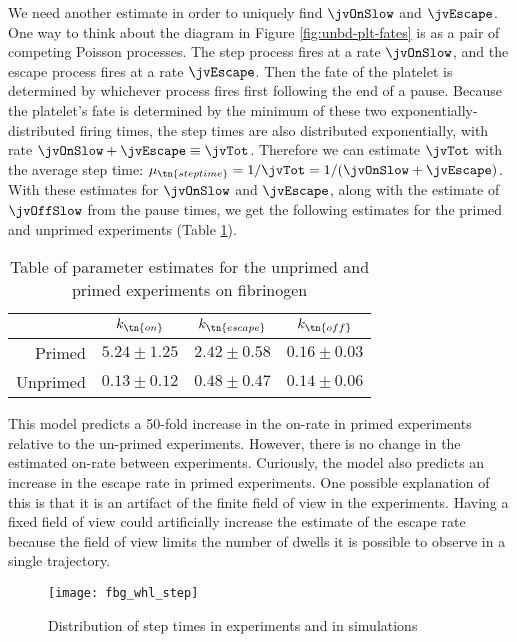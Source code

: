 We need another estimate in order to uniquely find $\jvOnSlow$ and
$\jvEscape$. One way to think about the diagram in Figure
\ref{fig:unbd-plt-fates} is as a pair of competing Poisson
processes. The step process fires at a rate $\jvOnSlow$, and the
escape process fires at a rate $\jvEscape$. Then the fate of the
platelet is determined by whichever process fires first following the
end of a pause. Because the platelet's fate is determined by the
minimum of these two exponentially-distributed firing times, the step
times are also distributed exponentially, with rate
$\jvOnSlow + \jvEscape \equiv \jvTot$. Therefore we can estimate
$\jvTot$ with the average step time:
$\mu_\tn{step time} = 1/\jvTot = 1/(\jvOnSlow + \jvEscape)$. With
these estimates for $\jvOnSlow$ and $\jvEscape$, along with the
estimate of $\jvOffSlow$ from the pause times, we get the following
estimates for the primed and unprimed experiments (Table
\ref{tab:par-est}). 

\begin{table}
  \centering
  \begin{tabular}{rccc} \toprule
    & $k_\tn{on}$ & $k_\tn{escape}$ & $k_\tn{off}$ \\ \midrule
    Primed & $5.24 \pm 1.25$ & $2.42 \pm 0.58$ & $0.16 \pm 0.03$ \\
    Unprimed & $0.13 \pm 0.12$ & $0.48 \pm 0.47$ & $0.14 \pm 0.06$ \\
    \bottomrule 
  \end{tabular}
  \caption{Table of parameter estimates for the unprimed and primed
    experiments on fibrinogen}
  \label{tab:par-est}
\end{table}

This model predicts a 50-fold increase in the on-rate in primed
experiments relative to the un-primed experiments. However, there is
no change in the estimated on-rate between experiments. Curiously, the
model also predicts an increase in the escape rate in primed
experiments. One possible explanation of this is that it is an
artifact of the finite field of view in the experiments. Having a
fixed field of view could artificially increase the estimate of the
escape rate because the field of view limits the number of dwells it
is possible to observe in a single trajectory.

\begin{figure}
  \centering
  \texttt{[image: fbg\_whl\_step]}
  \caption{Distribution of step times in experiments and in
    simulations}
  \label{fig:fbg-whl-step}
\end{figure}

